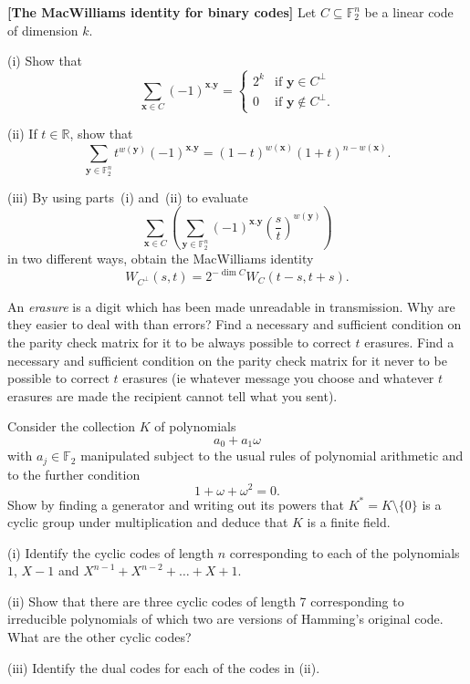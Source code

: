 \begin{question}{\bf[The MacWilliams identity for binary codes]}%
\label{E;MacWilliams}\label{C3.9}
Let $C\subseteq {\mathbb F}_{2}^{n}$ be a linear code
of dimension $k$.
 
(i) Show that
\[\sum_{{\mathbf x}\in C}(-1)^{{\mathbf x}.{\mathbf y}}
=\begin{cases}
2^{k}&\text{if ${\mathbf y}\in C^{\perp}$}\\
0&\text{if ${\mathbf y}\notin C^{\perp}$}.
\end{cases}\]

(ii) If $t\in{\mathbb R}$, show that
\[\sum_{{\mathbf y}\in {\mathbb F}_{2}^{n}}t^{w({\mathbf y})}
(-1)^{{\mathbf x}.{\mathbf y}}
=(1-t)^{w({\mathbf x})}(1+t)^{n-w({\mathbf x})}.\]

(iii) By using parts~(i) and~(ii) to evaluate
\[\sum_{{\mathbf x}\in C}
\left(\sum_{{\mathbf y}\in {\mathbb F}_{2}^{n}}
(-1)^{{\mathbf x}.{\mathbf y}}\left(\frac{s}{t}\right)^{w({\mathbf y})}
\right)\]
in two different ways, obtain the MacWilliams identity
\[W_{C^{\perp}}(s,t)=2^{-\dim C}W_{C}(t-s,t+s).\]
\end{question} 
\begin{question}\label{C3.10}
An \emph{erasure} is a digit which has
been made unreadable in transmission. Why are they
easier to deal with than errors? Find a necessary
and sufficient condition on the parity check matrix
for it to be always possible to correct
$t$ erasures.  Find a necessary
and sufficient condition on the parity check matrix
for it never to be possible to correct
$t$ erasures (ie whatever message you choose
and whatever $t$ erasures are made the recipient
cannot tell what you sent).
\end{question}
\begin{question}\label{C3.11}
Consider the collection $K$ of polynomials
\[a_{0}+a_{1}\omega\]
with $a_{j}\in{\mathbb F}_{2}$ manipulated
subject to the usual rules of polynomial
arithmetic and to the further condition
\[1+\omega+\omega^{2}=0.\]
Show by finding a generator and writing out its powers
that
$K^{*}=K\setminus\{0\}$ is a cyclic group
under multiplication and deduce that
$K$ is a finite field.

\end{question}
\begin{question}\label{C3.12}\label{E;Hamming original}
(i) Identify the cyclic codes of
length $n$ corresponding to each of the polynomials
$1$, $X-1$  and $X^{n-1}+X^{n-2}+\dots+X+1$.

(ii) Show that there are three cyclic codes
of length 7 corresponding to irreducible
polynomials of which two are versions of Hamming's
original code. What are the other cyclic codes?

(iii) Identify the dual codes for each of the
codes in (ii).
\end{question}
